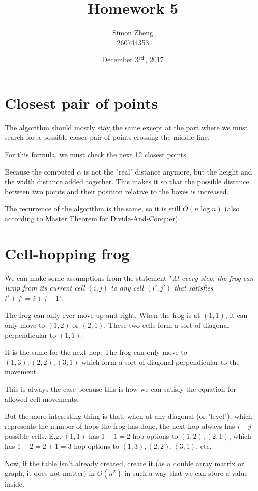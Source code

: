 \documentclass[11pt,letterpaper]{article}
\author{Simon Zheng\\260744353}
\title{Homework 5}
\date{December 3$^{\textnormal{rd}}$, 2017}
\begin{document}
	\maketitle
	\thispagestyle{fancy}
	
	\section{Closest pair of points}
		The algorithm should mostly stay the same except at the part where we must search for a possible closer pair of points crossing the middle line.
		
		For this formula, we must check the next 12 closest points.
		
		Because the computed $\alpha$ is not the "real" distance anymore, but the height and the width distance added together.
		This makes it so that the possible distance between two points and their position relative to the boxes is increased.%
		
		The recurrence of the algorithm is the same, so it is still $O(n\log n)$ (also according to Master Theorem for Divide-And-Conquer).
	
	\section{Cell-hopping frog}
		We can make some assumptions from the statement "\textit{At every step, the frog can jump from its current cell $(i, j)$ to any cell $(i\prime , j\prime)$ that satisfies $i\prime + j\prime = i + j + 1$}":
		
		The frog can only ever move up and right.
		When the frog is at $(1,1)$, it can only move to $(1,2)$ or $(2,1)$. These two cells form a sort of diagonal perpendicular to $(1,1)$.
		
		It is the same for the next hop:
		The frog can only move to $(1,3), (2,2), (3,1)$ which form a sort of diagonal perpendicular to the movement.
		
		This is always the case because this is how we can satisfy the equation for allowed cell movements.
		
		But the more interesting thing is that, when at any diagonal (or "level"), which represents the number of hops the frog has done, the next hop always has $i + j$ possible cells. E.g. $(1,1)$ has $1+1=2$ hop options to $(1,2), (2,1)$, which has $1+2=2+1=3$ hop options to $(1,3), (2,2), (3,1)$, etc.
		
		Now, if the table isn't already created, create it (as a double array matrix or graph, it does not matter) in $O(n^2)$ in such a way that we can store a value inside.
		 
\end{document}

